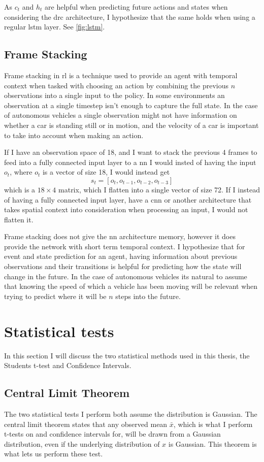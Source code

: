 \documentclass[UKenglish]{uiomasterthesis}
\begin{document}
As $c_t$ and $h_t$ are helpful when predicting future actions and states \cite{chung2024predictingfutureactionsreinforcement} when considering the \ac{drc} architecture, I hypothesize that the same holds when using a regular \ac{lstm} layer. See \cref{fig:lstm}.

\subsection{Frame Stacking}
Frame stacking in \ac{rl} is a technique used to provide an agent with temporal context when tasked with choosing an action by combining the previous $n$ observations into a single input to the policy. In some environments an observation at a single timestep isn't enough to capture the full state. In the case of autonomous vehicles a single observation might not have information on whether a car is standing still or in motion, and the velocity of a car is important to take into account when making an action.

If I have an observation space of 18, and I want to stack the previous 4 frames to feed into a fully connected input layer to a \ac{nn} I would insted of having the input $o_t$, where $o_t$ is a vector of size 18, I would instead get $$s_t = [o_t, o_{t-1}, o_{t-2}, o_{t-3}]$$ which is a $18\times4$ matrix, which I flatten into a single vector of size 72. If I instead of having a fully connected input layer, have a \ac{cnn} or another architecture that takes spatial context into consideration when processing an input, I would not flatten it.

Frame stacking does not give the \ac{nn} architecture memory, however it does provide the network with short term temporal context. I hypothesize that for event and state prediction for an agent, having information about previous observations and their transitions is helpful for predicting how the state will change in the future. In the case of autonomous vehicles its natural to assume that knowing the speed of which a vehicle has been moving will be relevant when trying to predict where it will be $n$ steps into the future.

\section{Statistical tests}
\label{sec:stat_meth}
In this section I will discuss the two statistical methods used in this thesis, the Students t-test and Confidence Intervals.

\subsection{Central Limit Theorem}
The two statistical tests I perform both assume the distribution is Gaussian. The central limit theorem states that any observed mean $\bar{x}$, which is what I perform t-tests on and confidence intervals for, will be drawn from a Gaussian distribution, even if the underlying distribution of $x$ is Gaussian\cite{clt}. This theorem is what lets us perform these test.
\end{document}
